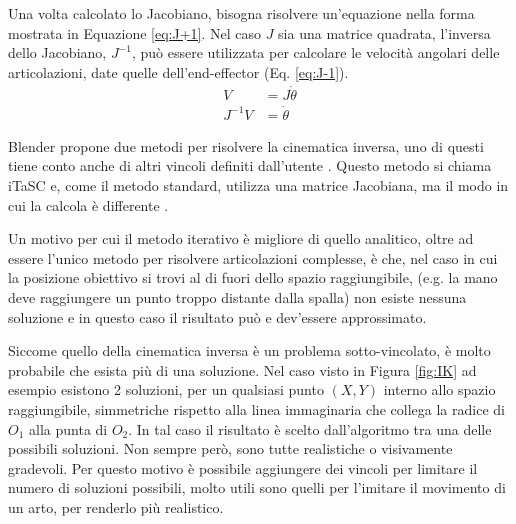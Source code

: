 Una volta calcolato lo Jacobiano, bisogna risolvere un'equazione nella forma mostrata in Equazione \ref{eq:J+1}. Nel caso $J$ sia una matrice quadrata, l'inversa dello Jacobiano, $J^{-1}$, può essere utilizzata per calcolare le velocità angolari delle articolazioni, date quelle dell'end-effector (Eq. \ref{eq:J-1}).
\begin{align}
    \label{eq:J+1}
    V &= J\dot{\theta}\\
    \label{eq:J-1}
    J^{-1}V &= \dot{\theta}
\end{align}

Blender propone due metodi per risolvere la cinematica inversa, uno di questi tiene conto anche di altri vincoli definiti dall'utente \cite{blendDoc}. Questo metodo si chiama iTaSC e, come il metodo standard, utilizza una matrice Jacobiana, ma il modo in cui la calcola è differente \cite{blendWiki}.

Un motivo per cui il metodo iterativo è migliore di quello analitico, oltre ad essere l'unico metodo per risolvere articolazioni complesse, è che, nel caso in cui la posizione obiettivo si trovi al di fuori dello spazio raggiungibile, (e.g. la mano deve raggiungere un punto troppo distante dalla spalla) non esiste nessuna soluzione e in questo caso il risultato può e dev'essere approssimato.

Siccome quello della cinematica inversa è un problema sotto-vincolato, è molto probabile che esista più di una soluzione. Nel caso visto in Figura \ref{fig:IK} ad esempio esistono 2 soluzioni, per un qualsiasi punto $(X,Y)$ interno allo spazio raggiungibile, simmetriche rispetto alla linea immaginaria che collega la radice di $O_1$ alla punta di $O_2$.
In tal caso il risultato è scelto dall'algoritmo tra una delle possibili soluzioni. Non sempre però, sono tutte realistiche o visivamente gradevoli.
Per questo motivo è possibile aggiungere dei vincoli per limitare il numero di soluzioni possibili, molto utili sono quelli per l'imitare il movimento di un arto, per renderlo più realistico.


